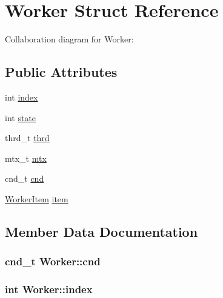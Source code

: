 \hypertarget{structWorker}{}\section{Worker Struct Reference}
\label{structWorker}


Collaboration diagram for Worker\+:
\subsection*{Public Attributes}
\begin{DoxyCompactItemize}
\item 
int \hyperlink{structWorker_a907158fe4322e1a0e2edeb426d85e757}{index}
\item 
int \hyperlink{structWorker_a1003e459fb7686782b33812bc9bbe95c}{state}
\item 
thrd\+\_\+t \hyperlink{structWorker_aadc19b994d770006cb5303fa46a257f8}{thrd}
\item 
mtx\+\_\+t \hyperlink{structWorker_a94f77d872408098dc5ff3d6380161c96}{mtx}
\item 
cnd\+\_\+t \hyperlink{structWorker_a9306d902e2a9177739345af14a3c4301}{cnd}
\item 
\hyperlink{structWorkerItem}{Worker\+Item} \hyperlink{structWorker_a5543b8205b70f14eaf07a15bd255580a}{item}
\end{DoxyCompactItemize}


\subsection{Member Data Documentation}
\subsubsection[{\texorpdfstring{cnd}{cnd}}]{\setlength{\rightskip}{0pt plus 5cm}cnd\+\_\+t Worker\+::cnd}\hypertarget{structWorker_a9306d902e2a9177739345af14a3c4301}{}\label{structWorker_a9306d902e2a9177739345af14a3c4301}
\subsubsection[{\texorpdfstring{index}{index}}]{\setlength{\rightskip}{0pt plus 5cm}int Worker\+::index}\hypertarget{structWorker_a907158fe4322e1a0e2edeb426d85e757}{}\label{structWorker_a907158fe4322e1a0e2edeb426d85e757}
